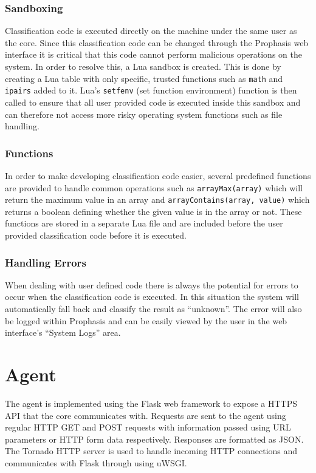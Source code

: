 \documentclass[bsc,deptreport,twoside,parskip,singlespacing,notimes]{infthesis}
\begin{document}
\subsubsection{Sandboxing}
\label{classification_sandboxing}

	Classification code is executed directly on the machine under the same user as
	the core.  Since this classification code can be changed through the Prophasis
	web interface it is critical that this code cannot perform malicious operations
	on the system.  In order to resolve this, a Lua sandbox is created.  This is
	done by creating a Lua table with only specific, trusted functions such as
	\texttt{math} and \texttt{ipairs} added to it.  Lua's \texttt{setfenv} (set
	function environment) function is then called to ensure that all user provided
	code is executed inside this sandbox and can therefore not access more risky
	operating system functions such as file handling.

\subsubsection{Functions}

	In order to make developing classification code easier, several predefined
	functions are provided to handle common operations such as
	\texttt{arrayMax(array)} which will return the maximum value in an array and
	\texttt{arrayContains(array, value)} which returns a boolean defining whether
	the given value is in the array or not.  These functions are stored in a
	separate Lua file and are included before the user provided classification code
	before it is executed.

\subsubsection{Handling Errors}

	When dealing with user defined code there is always the potential for errors
	to occur when the classification code is executed.  In this situation the
	system will automatically fall back and classify the result as ``unknown''. The
	error will also be logged within Prophasis and can be easily viewed by the user
	in the web interface's ``System Logs'' area.

\section{Agent}

	The agent is implemented using the Flask web framework to expose a HTTPS API
	that the core communicates with.  Requests are sent to the agent using regular
	HTTP GET and POST requests with information passed using URL parameters or HTTP
	form data respectively.  Responses are formatted as JSON.  The Tornado HTTP
	server is used to handle incoming HTTP connections and communicates with Flask
	through using uWSGI.
\end{document}
